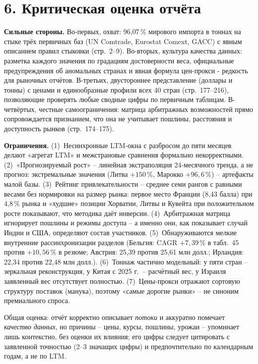 \documentclass[11pt,a4paper]{article}
\begin{document}
\section*{6. Критическая оценка отчёта}

\textbf{Сильные стороны.} Во-первых, охват: 96{,}07\,\% мирового импорта в тоннах на стыке трёх
первичных баз (UN Comtrade, Eurostat Comext, GACC) с явным описанием правил стыковки
(стр.~2--9). Во-вторых, культура качества данных: разметка каждого значения по градациям
достоверности веса, официальные предупреждения об аномальных странах и явная формула цен-прокси
- редкость для рыночных отчётов. В-третьих, двустороннее представление (доллары и тонны)
с ценами и единообразные профили всех 40 стран (стр.~177--216), позволяющие проверять любые
сводные цифры по первичным таблицам. В-четвёртых, честные самоограничения: матрица
арбитражных возможностей прямо сопровождается признанием, что она не учитывает пошлины,
расстояния и доступность рынков (стр.~174--175).

\textbf{Ограничения.} (1)~Несинхронные LTM-окна с разбросом до пяти месяцев делают «агрегат
LTM» и межстрановые сравнения формально некорректными. (2)~«Прогнозируемый рост» -- линейная
экстраполяция 24-месячного тренда, а не прогноз: экстремальные значения (Литва $+150\,\%$,
Марокко $+96{,}6\,\%$) -- артефакты малой базы. (3)~Рейтинг привлекательности -- среднее семи
рангов с равными весами без нормировки на размер рынка: первое место Франции (8{,}43 балла)
при 4{,}8\,\% рынка и «худшие» позиции Хорватии, Литвы и Кувейта при положительном росте
показывают, что методика даёт инверсии. (4)~Арбитражная матрица игнорирует пошлины и режимы
доступа -- а именно они, как показывает случай Индии и США, определяют состав участников.
(5)~Обнаруживаются мелкие внутренние рассинхронизации разделов (Бельгия: CAGR $+7{,}39\,\%$
в табл.~45 против $+10{,}56\,\%$ в резюме; Австрия: 25{,}39 против 25{,}61 млн долл.;
Ирландия: 22{,}34 против 22{,}48 млн долл.). (6)~Тоннаж частично модельный: у пяти стран --
зеркальная реконструкция, у Китая с 2025 г.\ -- расчётный вес, у Израиля заявленный вес
отсутствует полностью. (7)~Цены-прокси отражают сортовую структуру поставок (манука), поэтому
«самые дорогие рынки» -- не синоним премиального спроса.

Общая оценка: отчёт корректно описывает \emph{потоки} и аккуратно помечает \emph{качество
данных}, но причины -- цены, курсы, пошлины, урожаи -- упоминает лишь контекстно, без оценки
их влияния; его цифры следует цитировать с заявленной точностью (2--3 значащих цифры) и
предпочтительно по календарным годам, а не по LTM.
\end{document}

